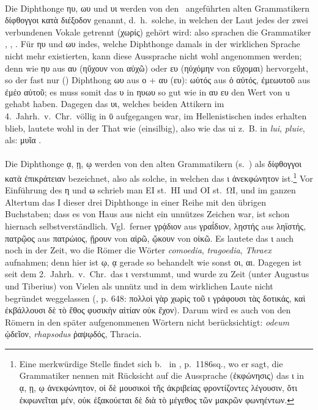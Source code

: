 \paragraph{} Die Diphthonge ηυ, ωυ und υι werden von
den~ angeführten alten
Grammatikern δίφθογγοι κατὰ διέξοδον genannt, d.~h.~solche, in welchen der Laut
jedes der zwei verbundenen Vokale getrennt (χωρίς) gehört wird: also sprachen
die Grammatiker , , . Für ηυ und ωυ indes, welche
Diphthonge damals in der wirklichen Sprache nicht mehr existierten, kann diese
Aussprache nicht wohl angenommen werden; denn wie ηυ aus αυ (ηὔχουν von αὐχῶ)
oder ευ (ηὐχόμην von εὔχομαι) hervorgeht, so der fast nur 
() Diphthong ωυ aus ο + αυ (ευ): ωὐτός 
aus ὀ αὐτός, ἐμεωυτοῦ aus ἐμέο αὐτοῦ; es muss somit das υ in ηυωυ so gut wie in
αυ ευ den Wert von u gehabt haben. Dagegen das υι, welches beiden Attikern im
4.~Jahrh.~v.~Chr.\ völlig in ῡ aufgegangen war, im Hellenistischen indes erhalten
blieb, lautete wohl in der That wie  (einsilbig), also wie das
 ui z.~B. in \emph{lui}, \emph{pluie}, als: μυῖα
.

\paragraph{\label{par:diphthongeaihiwi}} Die Diphthonge ᾳ, ῃ, ῳ werden von den alten Grammatikern
(s.~) als δίφθογγοι κατὰ
ἐπικράτειαν bezeichnet, also als solche, in welchen das ι ἀνεκφώ\-νητον
ist.\footnote{\label{foot:3131}Eine merkwürdige Stelle findet sich b.\ 
	in , p.\ 1186sq., wo er sagt, die Grammatiker nennen mit
	Rücksicht auf die Aussprache (ἐκφώνησις) das ι in ᾳ, ῃ, ῳ ἀνεκφώνητον, οἱ δὲ
	μουσικοὶ τῆς ἀκριβείας φροντίζοντες λέγουσιν, ὅτι ἐκφωνεῖται μέν, οὐκ ἐξακούεται
	δὲ διὰ τὸ μέγεθος τῶν μακρῶν φωνηέντων.}
Vor Einführung des η und ω schrieb man ΕΙ st.\ ΗΙ und ΟΙ st.\ ΩΙ, und im ganzen
Altertum das Ι dieser drei Diphthonge in einer Reihe mit den übrigen Buchstaben;
dass es von Haus aus nicht ein unnützes Zeichen war, ist schon hiernach
selbstverständlich.
Vgl.\ ferner γρᾴδιον aus γραΐδιον, λῃστής aus ληϊστής, πατρῷος aus πατρώιος,
ᾕρουν von αἱρῶ, ᾤκουν von οἰκῶ.
Es lautete das ι auch noch in der Zeit, wo die Römer die Wörter \emph{comoedia},
\emph{tragoedia}, \emph{Thraex} aufnahmen; denn hier ist ῳ, ᾳ gerade so
behandelt wie sonst οι, αι.
Dagegen ist seit dem 2.~Jahrh.~v.~Chr.\ das ι verstummt, und wurde zu
Zeit (unter Augustus und Tiberius) von Vielen als unnütz und in dem wirklichen
Laute nicht begründet weggelassen (, p. 648: πολλοὶ γὰρ χωρὶς τοῦ ι
γράφουσι τὰς δοτικάς, καὶ ἐκβάλλουσι δὲ τὸ ἔθος φυσικὴν αἰτίαν οὐκ ἔχον).
Darum wird es auch von den Römern in den später aufgenommenen Wörtern nicht
berücksichtigt: \emph{odeum} ᾠδεῖον, \emph{rhapsodus} ῥαψῳδός, Thracia.

